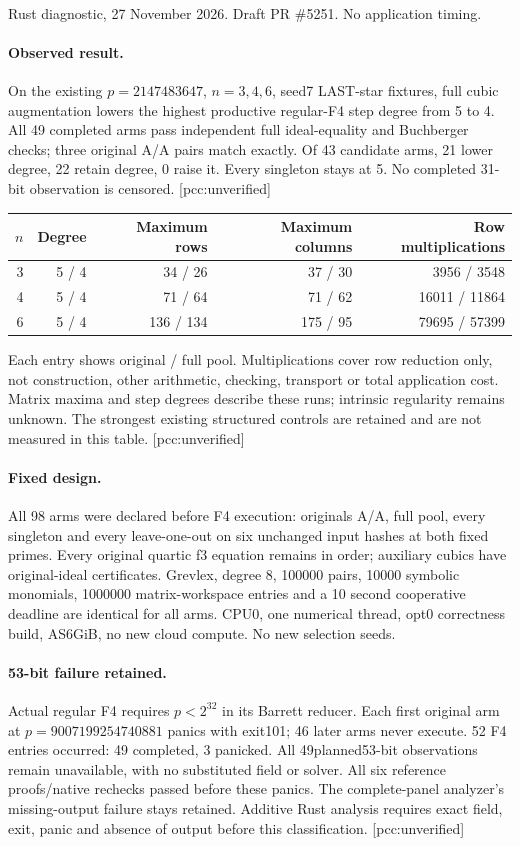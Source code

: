 \documentclass[10pt,a4paper]{article}
\begin{document}
\\[4pt]
{\small Rust diagnostic, 27 November 2026. Draft PR \#5251. No application timing.}
\paragraph{Observed result.} On the existing $p=2147483647$, $n=3,4,6$, seed7
LAST-star fixtures, full cubic augmentation lowers the highest productive
regular-F4 step degree from 5 to 4. All 49 completed arms pass independent full
ideal-equality and Buchberger checks; three original A/A pairs match exactly.
Of 43 candidate arms, 21 lower degree, 22 retain degree, 0 raise it. Every singleton
stays at 5. No completed 31-bit observation is censored. [pcc:unverified]
\begin{center}\begin{tabular}{rrrrr}\toprule
$n$ & Degree & Maximum rows & Maximum columns & Row multiplications\\
\midrule
3 & 5 / 4 & 34 / 26 & 37 / 30 & 3956 / 3548\\
4 & 5 / 4 & 71 / 64 & 71 / 62 & 16011 / 11864\\
6 & 5 / 4 & 136 / 134 & 175 / 95 & 79695 / 57399\\
\bottomrule\end{tabular}\end{center}
\noindent Each entry shows original / full pool. Multiplications cover row
reduction only, not construction, other arithmetic, checking, transport or total
application cost. Matrix maxima and step degrees describe these runs; intrinsic
regularity remains unknown. The strongest existing structured controls are
retained and are not measured in this table. [pcc:unverified]
\paragraph{Fixed design.} All 98 arms were declared before F4 execution: originals
A/A, full pool, every singleton and every leave-one-out on six unchanged input
hashes at both fixed primes. Every original quartic f3 equation remains in
order; auxiliary cubics have original-ideal certificates. Grevlex, degree 8,
100000 pairs, 10000 symbolic monomials, 1000000 matrix-workspace entries and a 10 second
cooperative deadline are identical for all arms. CPU0, one numerical thread,
opt0 correctness build, AS6GiB, no new cloud compute. No new selection seeds.
\paragraph{53-bit failure retained.} Actual regular F4 requires $p<2^{32}$ in
its Barrett reducer. Each first original arm at $p=9007199254740881$ panics with
exit101; 46 later arms never execute. 52 F4 entries occurred: 49 completed, 3 panicked.
All 49planned53-bit observations remain unavailable, with no substituted field
or solver. All six reference proofs/native rechecks passed before these
panics. The complete-panel analyzer's missing-output failure stays retained.
Additive Rust analysis requires exact field, exit, panic and absence of output
before this classification. [pcc:unverified]
\end{document}
